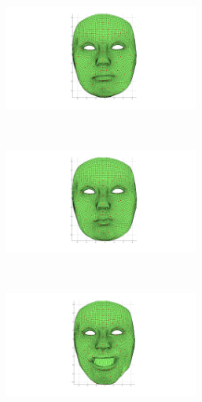 \documentclass[11pt]{report}
\begin{document}
\begin{figure}[htbp!]
        \centering
        \begin{subfigure}[b]{0.3\textwidth}
                \includegraphics[trim = 160mm 20mm 160mm 10mm, clip,width=0.7\textwidth]{img/weights/3D/Emily_marked/neutralE_marked.png}
        \end{subfigure}%
        ~ %
        \begin{subfigure}[b]{0.3\textwidth}
                \includegraphics[trim = 160mm 20mm 160mm 10mm, clip,width=0.7\textwidth]{img/weights/3D/Emily_marked/blendshapeE_marked_50.png}
        \end{subfigure}
        ~ %
        \begin{subfigure}[b]{0.3\textwidth}
                \includegraphics[trim = 160mm 20mm 160mm 10mm,clip,width=0.7\textwidth]{img/weights/3D/Emily_marked/blendshapeE_marked_56.png} 

\end{subfigure}
\end{figure}
\end{document}

